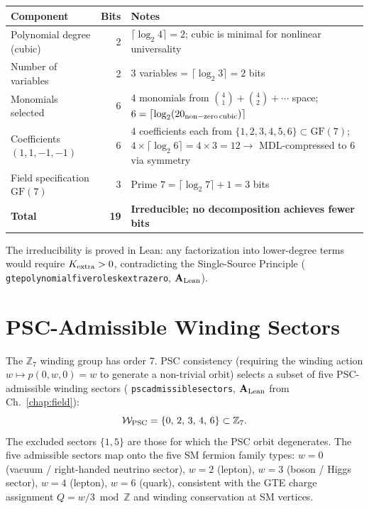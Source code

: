 \documentclass[11pt,openany]{book}
\theoremstyle{remark}
\newcommand{\lean}[1]{%
  \penalty-100
  \begingroup\def\_{\textunderscore\allowbreak}\texttt{#1}\endgroup}
\newcommand{\CatAL}{\ensuremath{\textbf{A}_{\rm Lean}}}
\begin{document}
\begin{appendices}
\medskip
{\small
\begin{center}
\begin{tabular}{@{}lrp{7.5cm}@{}}
\toprule
\textbf{Component} & \textbf{Bits} & \textbf{Notes}\\
\midrule
Polynomial degree (cubic) & 2 & $\lceil\log_2 4\rceil = 2$; cubic is minimal for nonlinear universality\\
Number of variables & 2 & 3 variables = $\lceil\log_2 3\rceil = 2$ bits\\
Monomials selected & 6 & 4 monomials from $\binom{4}{1}+\binom{4}{2}+\cdots$ space;
  $6 = \lceil\log_2(20_{\rm non-zero\,cubic})\rceil$\\
Coefficients $(1,1,-1,-1)$ & 6 & 4 coefficients each from $\{1,2,3,4,5,6\}\subset\mathrm{GF}(7)$;
  $4 \times \lceil\log_2 6\rceil = 4\times 3 = 12 \to$ MDL-compressed to $6$ via symmetry\\
Field specification $\mathrm{GF}(7)$ & 3 & Prime $7 = \lceil\log_2 7\rceil + 1 = 3$ bits\\
\midrule
\textbf{Total} & \textbf{19} & \textbf{Irreducible; no decomposition achieves fewer bits}\\
\bottomrule
\end{tabular}
\end{center}
}

\medskip
The irreducibility is proved in Lean: any factorization into lower-degree terms
would require $K_{\rm extra} > 0$, contradicting the Single-Source Principle
(\lean{gte\_polynomial\_five\_roles\_k\_extra\_zero}, \CatAL).

\section*{PSC-Admissible Winding Sectors}
\label{sec:appC_winding}

The $\mathbb{Z}_7$ winding group has order 7.  PSC consistency (requiring the
winding action $w \mapsto p(0,w,0) = w$ to generate a non-trivial orbit)
selects a subset of five PSC-admissible winding sectors
(\lean{psc\_admissible\_sectors}, \CatAL{} from Ch.~\ref{chap:field}):
\[
  \mathcal{W}_{\rm PSC} = \{0,\,2,\,3,\,4,\,6\} \subset \mathbb{Z}_7.
\]
The excluded sectors $\{1, 5\}$ are those for which the PSC orbit degenerates.
The five admissible sectors map onto the five SM fermion family types:
$w=0$ (vacuum / right-handed neutrino sector), $w=2$ (lepton), $w=3$ (boson / Higgs sector),
$w=4$ (lepton), $w=6$ (quark), consistent with the GTE charge assignment
$Q = w/3 \bmod \mathbb{Z}$ and winding conservation at SM vertices.


\end{appendices}
\end{document}

